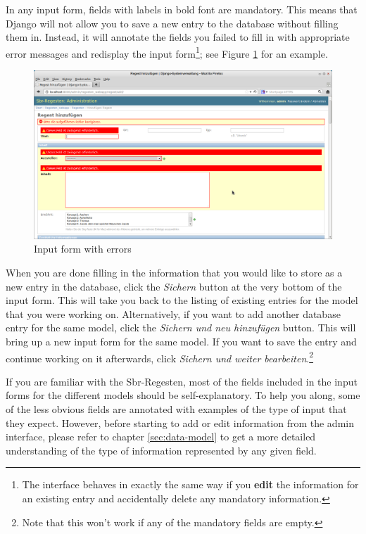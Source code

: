 In any input form, fields with labels in bold font are mandatory. This
means that Django will not allow you to save a new entry to the
database without filling them in. Instead, it will annotate the fields
you failed to fill in with appropriate error messages and redisplay
the input form\footnote{The interface behaves in exactly the same way
  if you \textbf{edit} the information for an existing entry and
  accidentally delete any mandatory information.}; see Figure
\ref{fig:add-regest-fail} for an example.

\begin{figure}[h]
  \centering
  \includegraphics[scale=0.3]{img/add-regest-fail}
  \caption{Input form with errors}
  \label{fig:add-regest-fail}
\end{figure}

When you are done filling in the information that you would like to
store as a new entry in the database, click the \emph{Sichern} button
at the very bottom of the input form. This will take you back to the
listing of existing entries for the model that you were working on.
Alternatively, if you want to add another database entry for the same
model, click the \emph{Sichern und neu hinzufügen} button. This will
bring up a new input form for the same model. If you want to save the
entry and continue working on it afterwards, click \emph{Sichern und
  weiter bearbeiten}.\footnote{Note that this won't work if any of the
  mandatory fields are empty.}

If you are familiar with the Sbr-Regesten, most of the fields included
in the input forms for the different models should be
self-explanatory. To help you along, some of the less obvious fields
are annotated with examples of the type of input that they expect.
However, before starting to add or edit information from the admin
interface, please refer to chapter \ref{sec:data-model} to get a more
detailed understanding of the type of information represented by any
given field.

